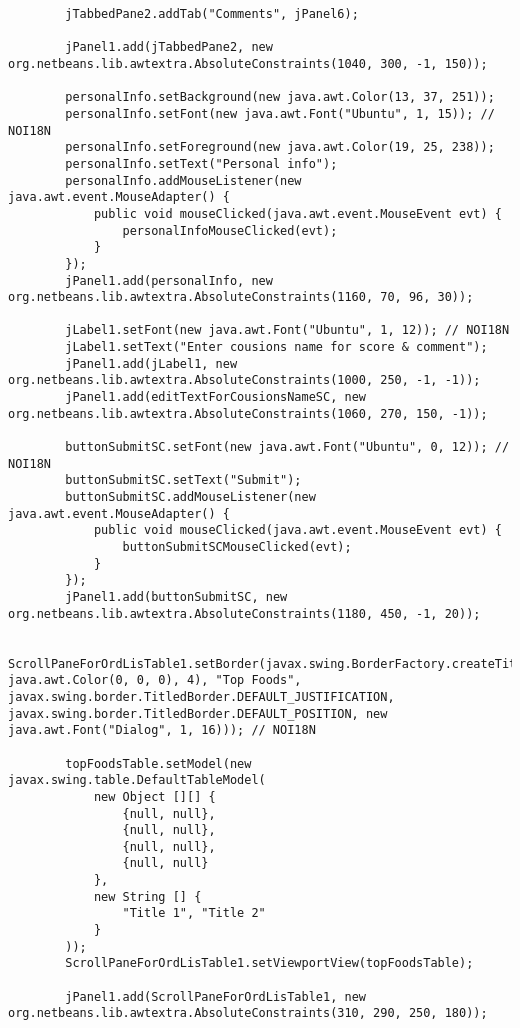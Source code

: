 \documentclass[12pt,a4paper]{article}
\begin{document}
\begin{lstlisting}
        jTabbedPane2.addTab("Comments", jPanel6);

        jPanel1.add(jTabbedPane2, new org.netbeans.lib.awtextra.AbsoluteConstraints(1040, 300, -1, 150));

        personalInfo.setBackground(new java.awt.Color(13, 37, 251));
        personalInfo.setFont(new java.awt.Font("Ubuntu", 1, 15)); // NOI18N
        personalInfo.setForeground(new java.awt.Color(19, 25, 238));
        personalInfo.setText("Personal info");
        personalInfo.addMouseListener(new java.awt.event.MouseAdapter() {
            public void mouseClicked(java.awt.event.MouseEvent evt) {
                personalInfoMouseClicked(evt);
            }
        });
        jPanel1.add(personalInfo, new org.netbeans.lib.awtextra.AbsoluteConstraints(1160, 70, 96, 30));

        jLabel1.setFont(new java.awt.Font("Ubuntu", 1, 12)); // NOI18N
        jLabel1.setText("Enter cousions name for score & comment");
        jPanel1.add(jLabel1, new org.netbeans.lib.awtextra.AbsoluteConstraints(1000, 250, -1, -1));
        jPanel1.add(editTextForCousionsNameSC, new org.netbeans.lib.awtextra.AbsoluteConstraints(1060, 270, 150, -1));

        buttonSubmitSC.setFont(new java.awt.Font("Ubuntu", 0, 12)); // NOI18N
        buttonSubmitSC.setText("Submit");
        buttonSubmitSC.addMouseListener(new java.awt.event.MouseAdapter() {
            public void mouseClicked(java.awt.event.MouseEvent evt) {
                buttonSubmitSCMouseClicked(evt);
            }
        });
        jPanel1.add(buttonSubmitSC, new org.netbeans.lib.awtextra.AbsoluteConstraints(1180, 450, -1, 20));

        ScrollPaneForOrdLisTable1.setBorder(javax.swing.BorderFactory.createTitledBorder(javax.swing.BorderFactory.createLineBorder(new java.awt.Color(0, 0, 0), 4), "Top Foods", javax.swing.border.TitledBorder.DEFAULT_JUSTIFICATION, javax.swing.border.TitledBorder.DEFAULT_POSITION, new java.awt.Font("Dialog", 1, 16))); // NOI18N

        topFoodsTable.setModel(new javax.swing.table.DefaultTableModel(
            new Object [][] {
                {null, null},
                {null, null},
                {null, null},
                {null, null}
            },
            new String [] {
                "Title 1", "Title 2"
            }
        ));
        ScrollPaneForOrdLisTable1.setViewportView(topFoodsTable);

        jPanel1.add(ScrollPaneForOrdLisTable1, new org.netbeans.lib.awtextra.AbsoluteConstraints(310, 290, 250, 180));


\end{lstlisting}
\end{document}
